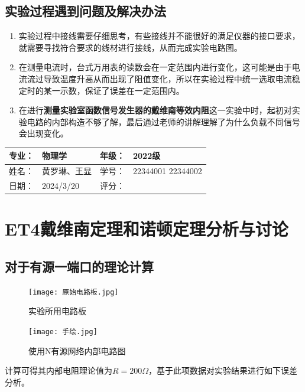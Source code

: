 \documentclass[dvipsnames, svgnames,a4paper,11pt]{article}
\begin{document}
	
	\clearpage
	
	
	\subsection{实验过程遇到问题及解决办法}
	\begin{enumerate}
		\item 实验过程中接线需要仔细思考，有些接线并不能很好的满足仪器的接口要求，就需要寻找符合要求的线材进行接线，从而完成实验电路图。
		\item 在测量电流时，台式万用表的读数会在一定范围内进行变化，这可能是由于电流流过导致温度升高从而出现了阻值变化，所以在实验过程中统一选取电流稳定时的某一示数，保证了误差在一定范围内。
		\item 在进行\textbf{测量实验室函数信号发生器的戴维南等效内阻}这一实验中时，起初对实验电路的内部构造不够了解，最后通过老师的讲解理解了为什么负载不同信号会出现变化。
	\end{enumerate}
	
	
	
	\clearpage
	
	\begin{table}
		\renewcommand\arraystretch{1.7}
		\begin{tabularx}{\textwidth}{|X|X|X|X|}
			\hline
			专业：& 物理学 &年级：& 2022级\\
			\hline
			姓名： & 黄罗琳、王显 & 学号：&22344001 22344002 \\
			\hline
			日期：& 2024/3/20 & 评分： &\\
			\hline
		\end{tabularx}
	\end{table}
	
	\section{ET4戴维南定理和诺顿定理\quad\heiti 分析与讨论}
	
	\subsection{对于有源一端口的理论计算}
	\begin{figure}[H]
		\begin{minipage}[b]{0.45\linewidth}
			\centering
			\texttt{[image: 原始电路板.jpg]}
			\caption{实验所用电路板}
		\end{minipage}
		\hfill
		\begin{minipage}[b]{0.45\linewidth}
			\centering
			\texttt{[image: 手绘.jpg]}
			\caption{使用N有源网络内部电路图}
		\end{minipage}
	\end{figure}
	计算可得其内部电阻理论值为$R=200 \Omega $，基于此项数据对实验结果进行如下误差分析。
\end{document}
